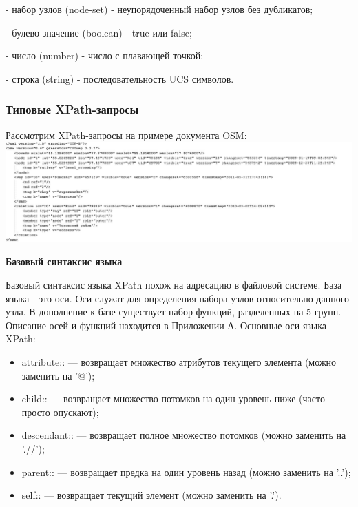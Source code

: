 \documentclass[12pt,a4paper,oneside]{article} %
\begin{document}
- набор узлов (node-set) - неупорядоченный набор узлов без дубликатов;

- булево значение (boolean) - true или false;

- число (number) - число с плавающей точкой;

- строка (string) - последовательность UCS символов.

\subsubsection{Типовые XPath-запросы}

Рассмотрим XPath-запросы на примере документа OSM:
\\[10pt]
\includegraphics[width=1.15\linewidth]{examplemap_osm}

\textbf{Базовый синтаксис языка}

Базовый синтаксис языка XPath похож на адресацию в файловой системе. \linebreak
База языка - это оси. Оси служат для определения набора узлов \linebreak
относительно данного узла. В дополнение к базе существует набор функций, \linebreak
разделенных на 5 групп. Описание осей и функций находится в Приложении А. \linebreak
Основные оси языка XPath:
\begin{itemize}
\item attribute:: — возвращает множество атрибутов текущего элемента \linebreak
(можно заменить на '@');
\item child:: — возвращает множество потомков на один уровень ниже \linebreak
(часто просто опускают);
\item descendant:: — возвращает полное множество потомков (можно \linebreak
заменить на './/');
\item parent:: — возвращает предка на один уровень назад (можно \linebreak
заменить на '..');
\item self:: — возвращает текущий элемент (можно заменить на '.').
\end{itemize}
\end{document}

